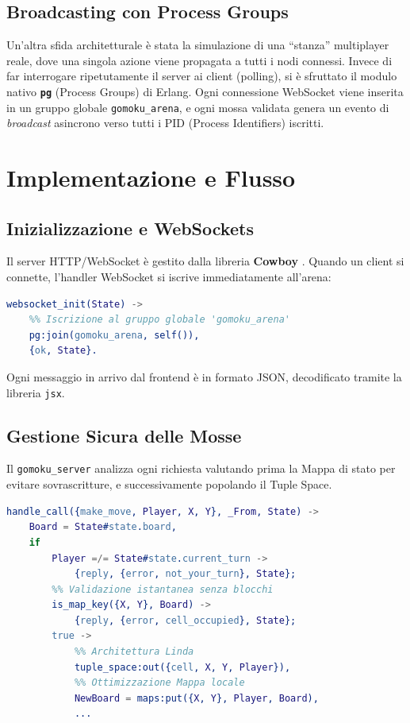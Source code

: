 \documentclass{article}
\begin{document}
\subsection{Broadcasting con Process Groups}
Un'altra sfida architetturale \`e stata la simulazione di una ``stanza'' multiplayer reale, dove una singola azione viene propagata a tutti i nodi connessi. Invece di far interrogare ripetutamente il server ai client (polling), si \`e sfruttato il modulo nativo \textbf{\texttt{pg}} (Process Groups) di Erlang. Ogni connessione WebSocket viene inserita in un gruppo globale \texttt{gomoku\_arena}, e ogni mossa validata genera un evento di \textit{broadcast} asincrono verso tutti i PID (Process Identifiers) iscritti.

\section{Implementazione e Flusso}

\subsection{Inizializzazione e WebSockets}
Il server HTTP/WebSocket \`e gestito dalla libreria \textbf{Cowboy} \cite{cowboy}. Quando un client si connette, l'handler WebSocket si iscrive immediatamente all'arena:
\begin{lstlisting}[language=Erlang, caption=Iscrizione al Process Group]
websocket_init(State) ->
    %% Iscrizione al gruppo globale 'gomoku_arena'
    pg:join(gomoku_arena, self()),
    {ok, State}.
\end{lstlisting}
Ogni messaggio in arrivo dal frontend \`e in formato JSON, decodificato tramite la libreria \texttt{jsx}.

\subsection{Gestione Sicura delle Mosse}
Il \texttt{gomoku\_server} analizza ogni richiesta valutando prima la Mappa di stato per evitare sovrascritture, e successivamente popolando il Tuple Space.

\begin{lstlisting}[language=Erlang, caption=Validazione O(1) e aggiornamento Tuple Space]
handle_call({make_move, Player, X, Y}, _From, State) ->
    Board = State#state.board,
    if 
        Player =/= State#state.current_turn ->
            {reply, {error, not_your_turn}, State};
        %% Validazione istantanea senza blocchi
        is_map_key({X, Y}, Board) ->
            {reply, {error, cell_occupied}, State};
        true ->
            %% Architettura Linda
            tuple_space:out({cell, X, Y, Player}),
            %% Ottimizzazione Mappa locale
            NewBoard = maps:put({X, Y}, Player, Board),
            ...
\end{lstlisting}
\end{document}
